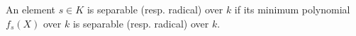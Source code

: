 An element $s \in K$ is separable (resp. radical) over $k$ if its minimum polynomial $f_s(X)$ over $k$ is separable (resp. radical) over $k$.
